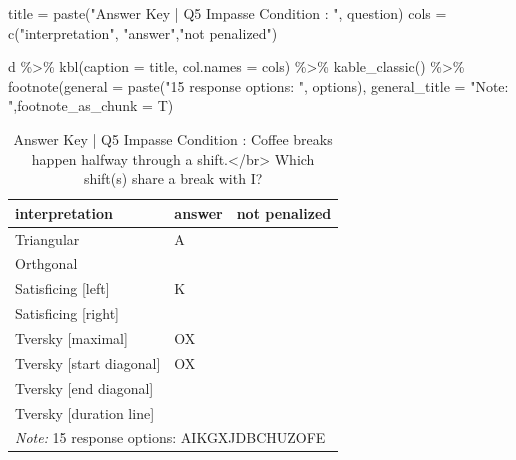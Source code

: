 \documentclass[
  letterpaper,
  DIV=11,
  numbers=noendperiod]{scrreprt}
\newenvironment{Shaded}{\begin{snugshade}}{\end{snugshade}}
\newcommand{\AttributeTok}[1]{\textcolor[rgb]{0.40,0.45,0.13}{#1}}
\newcommand{\FunctionTok}[1]{\textcolor[rgb]{0.28,0.35,0.67}{#1}}
\newcommand{\NormalTok}[1]{\textcolor[rgb]{0.00,0.23,0.31}{#1}}
\newcommand{\OtherTok}[1]{\textcolor[rgb]{0.00,0.23,0.31}{#1}}
\newcommand{\SpecialCharTok}[1]{\textcolor[rgb]{0.37,0.37,0.37}{#1}}
\newcommand{\StringTok}[1]{\textcolor[rgb]{0.13,0.47,0.30}{#1}}
\begin{document}
\begin{Shaded}
\begin{Highlighting}[]
\NormalTok{title }\OtherTok{=} \FunctionTok{paste}\NormalTok{(}\StringTok{"Answer Key | Q5 Impasse Condition : "}\NormalTok{, question)}
\NormalTok{cols }\OtherTok{=} \FunctionTok{c}\NormalTok{(}\StringTok{"interpretation"}\NormalTok{, }\StringTok{"answer"}\NormalTok{,}\StringTok{"not penalized"}\NormalTok{)}

\NormalTok{d }\SpecialCharTok{\%\textgreater{}\%} \FunctionTok{kbl}\NormalTok{(}\AttributeTok{caption =}\NormalTok{ title, }\AttributeTok{col.names =}\NormalTok{ cols) }\SpecialCharTok{\%\textgreater{}\%} \FunctionTok{kable\_classic}\NormalTok{() }\SpecialCharTok{\%\textgreater{}\%} 
  \FunctionTok{footnote}\NormalTok{(}\AttributeTok{general =} \FunctionTok{paste}\NormalTok{(}\StringTok{"15 response options: "}\NormalTok{, options), }\AttributeTok{general\_title =} \StringTok{"Note: "}\NormalTok{,}\AttributeTok{footnote\_as\_chunk =}\NormalTok{ T) }
\end{Highlighting}
\end{Shaded}

\begin{table}

\caption{Answer Key | Q5 Impasse Condition :  Coffee breaks happen halfway through a shift.</br> Which shift(s) share a break with I?}
\centering
\begin{tabular}[t]{l|l|l}
\hline
interpretation & answer & not penalized\\
\hline
Triangular & A & \\
\hline
Orthgonal &  & \\
\hline
Satisficing [left] & K & \\
\hline
Satisficing [right] &  & \\
\hline
Tversky [maximal] & OX & \\
\hline
Tversky [start diagonal] & OX & \\
\hline
Tversky [end diagonal] &  & \\
\hline
Tversky [duration line] &  & \\
\hline
\multicolumn{3}{l}{\rule{0pt}{1em}\textit{Note: } 15 response options:  AIKGXJDBCHUZOFE}\\
\end{tabular}
\end{table}
\end{document}
